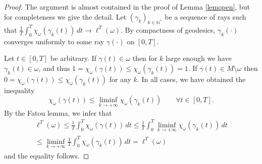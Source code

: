 \documentclass[10pt]{amsart}
\def\N{\mathbb{N}}
\theoremstyle{definition}
\begin{document}
\begin{proof}
The argument is almost contained in the proof of Lemma \ref{lemopen}, but for completeness we give the detail.
Let $(\gamma_k)_{k\in\N^*}$ be a sequence of rays such that $\frac{1}{T}\int_0^T\chi_\omega(\gamma_k(t))\, dt \rightarrow \ell^T(\omega)$. By compactness of geodesics, $\gamma_k(\cdot)$ converges uniformly to some ray $\gamma(\cdot)$ on $[0,T]$.

Let $t\in[0,T]$ be arbitrary. If $\gamma(t)\in \omega$ then for $k$ large enough we have $\gamma_k(t)\in \omega$, and thus $1=\chi_{\omega}(\gamma(t))\leq \chi_{\omega}(\gamma_k(t))=1$. If $\gamma(t)\in M\setminus\omega$ then $0=\chi_{\omega}(\gamma(t))\leq \chi_{\omega}(\gamma_k(t))$ for any $k$. In all cases, we have obtained the inequality
\[
\chi_{\omega}(\gamma(t)) \leq \liminf_{k\rightarrow+\infty} \chi_{\omega}(\gamma_k(t)) \qquad \forall t\in[0,T].
\]
By the Fatou lemma, we infer that
\begin{multline*}
\ell^T(\omega)\leq \frac{1}{T}\int_0^T\chi_\omega(\gamma(t))\, dt \leq \frac{1}{T}\int_0^T \liminf_{k\rightarrow+\infty}\chi_\omega(\gamma_k(t))\, dt \\
\leq \liminf_{k\rightarrow+\infty} \frac{1}{T}\int_0^T \chi_\omega(\gamma_k(t))\, dt = \ell^T(\omega)
\end{multline*}
and the equality follows.
\end{proof}
\end{document}
